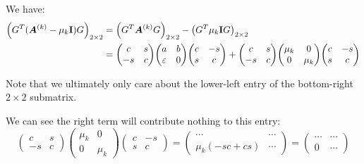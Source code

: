 \documentclass[twoside,10pt]{article}
\begin{document}
We have:
\begin{align*}
  \left(G^T(\mtx{A}^{(k)} - \mu_k \Id)G\right)_{2\times2} &= \left(G^T\mtx{A}^{(k)}G\right)_{2\times2} -\left(G^T \mu_k \Id G\right)_{2\times2}\\
  &=
  \begin{pmatrix}
      c & s \\
      -s & c
  \end{pmatrix}
  \begin{pmatrix}
      a & b \\
      \varepsilon & 0
  \end{pmatrix}
  \begin{pmatrix}
      c & -s \\
      s & c
  \end{pmatrix} +
  \begin{pmatrix}
    c & s \\
    -s & c
\end{pmatrix}
\begin{pmatrix}
    \mu_k & 0 \\
    0 & \mu_k
\end{pmatrix}
\begin{pmatrix}
    c & -s \\
    s & c
\end{pmatrix} 
\end{align*}

Note that we ultimately only care about the lower-left entry of the bottom-right $2\times2$ submatrix.

We can see the right term will contribute nothing to this entry:
$$
\begin{pmatrix}
  c & s \\
  -s & c
\end{pmatrix}
\begin{pmatrix}
  \mu_k & 0 \\
  0 & \mu_k
\end{pmatrix}
\begin{pmatrix}
  c & -s \\
  s & c
\end{pmatrix} = 
\begin{pmatrix}
  \cdots & \cdots \\
  \mu_k(-sc + cs) & \cdots 
\end{pmatrix} = 
\begin{pmatrix}
  \cdots & \cdots \\
  0 & \cdots 
\end{pmatrix}
$$
\end{document}
